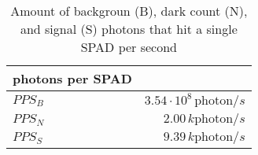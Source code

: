 \begin{table}[H]
\centering
\caption{Amount of backgroun (B), dark count (N), and signal (S) photons that hit a single SPAD per second}
\label{tab:photons_per_SPAD}
\begin{tabular}{|l|r|}\hline
    \textbf{photons per SPAD} & \\
    \hline 
    $PPS_B$ & $3.54\cdot10^{8}\,\text{photon}/s$ \\
    $PPS_N$ & $2.00\,k \text{photon}/s$ \\
    $PPS_S$ & $9.39\,k \text{photon}/s$ \\
    \hline 
\end{tabular}
\end{table}
